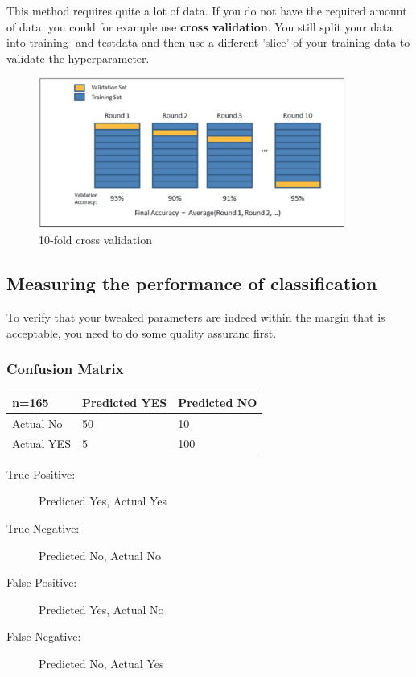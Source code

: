 \documentclass[11pt]{article}
\renewcommand*{\thead}[1]{\bfseries #1}
\begin{document}
This method requires quite a lot of data. If you do not have the required amount of data, you could for example use \textbf{cross validation}. You still split your data into training- and testdata and then use a different 'slice' of your training data to validate the hyperparameter.

\begin{figure}[htb!]
    \centering
    \includegraphics[keepaspectratio=true,width=0.9\textwidth]{cross_validation.png}
    \caption{10-fold cross validation}
    \label{fig:cross_validation}
\end{figure}

\subsection{Measuring the performance of classification}

To verify that your tweaked parameters are indeed within the margin that is acceptable, you need to do some quality assuranc first.

\subsubsection{Confusion Matrix}

\begin{minipage}{0.45\textwidth}
    \begin{tabular}{|p{1.5cm}|p{1.5cm}|p{1.5cm}|}
        \hline
        \thead{n=165} & Predicted YES & Predicted NO \\
        \hline
        Actual No     & 50            & 10           \\
        \hline
        Actual YES    & 5             & 100          \\
        \hline
    \end{tabular}
\end{minipage}\hfill
\begin{minipage}{0.55\textwidth}
    \begin{description}
        \item[True Positive: ] Predicted Yes, Actual Yes
        \item[True Negative: ] Predicted No, Actual No
        \item[False Positive: ] Predicted Yes, Actual No
        \item[False Negative: ] Predicted No, Actual Yes
    \end{description}
\end{minipage}
\end{document}

